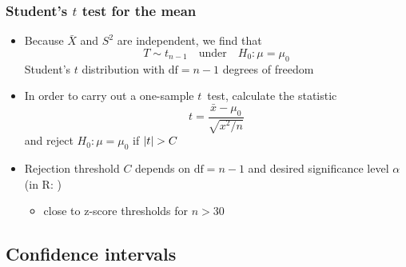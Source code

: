 \documentclass[t,notes=show]{beamer} %
\begin{document}
\begin{frame}
  \frametitle{Student's $t$ test for the mean}

  \begin{itemize}
  \item Because $\bar{X}$ and $S^2$ are independent, we find that
    \[
    T \sim t_{n-1} \quad\text{under}\quad H_0: \mu = \mu_0
    \]
    Student's \h{$t$ distribution} with $\text{df} = n-1$ degrees of freedom
  \item In order to carry out a one-sample $t$~test, calculate the statistic
    \[
    t = \frac{\bar{x} - \mu_0}{\sqrt{x^2 / n}}    
    \]
    and reject $H_0: \mu=\mu_0$ if $\lvert t\rvert > C$
  \item Rejection threshold $C$ depends on $\text{df} = n-1$ and desired
    significance level $\alpha$ (in R: )
    \begin{itemize}
    \item[\hand] close to z-score thresholds for $n > 30$
    \end{itemize}
  \end{itemize}
\end{frame}

\subsection{Confidence intervals}
\end{document}
